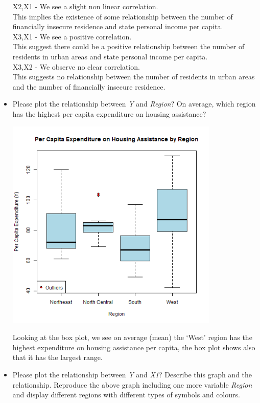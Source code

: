 \documentclass[12pt,letterpaper]{article}
\begin{document}
\begin{itemize}
X2,X1 - We see a slight non linear correlation.\\
		This implies the existence of some relationship between the number of financially insecure residence and state personal income per capita.\\

X3,X1 - We see a positive correlation.\\
		This suggest there could be a positive relationship between the number of residents in urban areas and state personal income per capita.\\
		
		 
X3,X2 - We observe no clear correlation.\\
		This suggests no relationship between the number of residents in urban areas and the number of financially insecure residence.\\



\newpage
\item
Please plot the relationship between \emph{Y} and \emph{Region}? On average, which region has the highest per capita expenditure on housing assistance?
\vspace{.5cm}

\includegraphics[width=0.8\textwidth]{images/Y_against_Region.png}

Looking at the box plot, we see on average (mean) the `West' region has the highest expenditure on housing assistance per capita, the box plot shows also that it has the largest range.

\newpage
\item
Please plot the relationship between \emph{Y} and \emph{X1}? Describe this graph and the relationship. Reproduce the above graph including one more variable \emph{Region} and display different regions with different types of symbols and colours.


\end{itemize}
\end{document}
